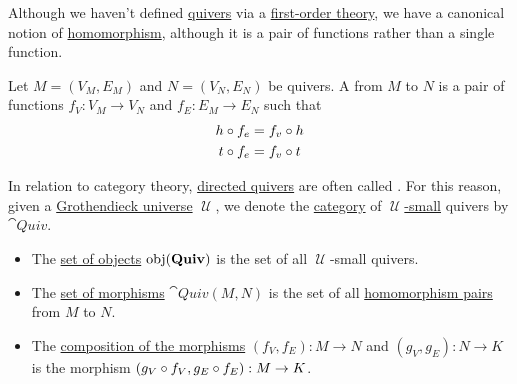 \begin{definition}\label{def:quiver_homomorphism}
  Although we haven't defined \hyperref[def:graph/quiver]{quivers} via a \hyperref[def:first_order_theory]{first-order theory}, we have a canonical notion of \hyperref[def:first_order_homomorphism]{homomorphism}, although it is a pair of functions rather than a single function.

  Let \( M = (V_M, E_M) \) and \( N = (V_N, E_N) \) be quivers. A  from \( M \) to \( N \) is a pair of functions \( f_V: V_M \to V_N \) and \( f_E: E_M \to E_N \) such that
  \begin{align}
    h \mathbin \circ f_e &= f_v \mathbin \circ h \label{eq:def:quiver_homomorphism/head} \\
    t \mathbin \circ f_e &= f_v \mathbin \circ t \label{eq:def:quiver_homomorphism/tail}
  \end{align}
\end{definition}

\begin{definition}\label{def:category_of_qivers}
  In relation to category theory, \hyperref[def:graph/quiver/directed]{directed quivers} are often called . For this reason, given a \hyperref[def:grothendieck_universe]{Grothendieck universe} \( \mscrU \), we denote the \hyperref[def:category]{category} of \hyperref[def:large_and_small_sets]{\( \mscrU \)-small} quivers by \( \cat{Quiv} \).

  \begin{itemize}
    \item The \hyperref[def:category/C1]{set of objects} \( \operatorname{obj}(\operatorname{\mathbf{Quiv}}) \) is the set of all \( \mscrU \)-small quivers.
    \item The \hyperref[def:category/C2]{set of morphisms} \( \cat{Quiv}(M, N) \) is the set of all \hyperref[def:quiver_homomorphism]{homomorphism pairs} from \( M \) to \( N \).

    \item The \hyperref[def:category/C3]{composition of the morphisms} \( (f_V, f_E): M \to N \) and \( (g_V, g_E): N \to K \) is the morphism \( (g_V \mathbin \circ f_V, g_E \mathbin \circ f_E): M \to K \).
  \end{itemize}
\end{definition}
